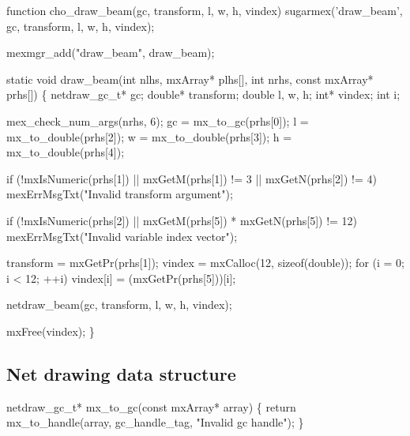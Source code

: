 \nwenddocs{}\endmoddef
function cho_draw_beam(gc, transform, l, w, h, vindex)
sugarmex('draw_beam', gc, transform, l, w, h, vindex);
\nwendcode{}\nwdocspar

\nwenddocs{}\plusendmoddef
mexmgr_add("draw_beam", draw_beam);
\nwendcode{}\nwdocspar

\nwenddocs{}\plusendmoddef
static void draw_beam(int nlhs, mxArray* plhs[],
                      int nrhs, const mxArray* prhs[])
\{
    netdraw_gc_t* gc;
    double* transform;
    double l, w, h;
    int* vindex;
    int i;

    mex_check_num_args(nrhs, 6);
    gc = mx_to_gc(prhs[0]);
    l  = mx_to_double(prhs[2]);
    w  = mx_to_double(prhs[3]);
    h  = mx_to_double(prhs[4]);

    if (!mxIsNumeric(prhs[1]) || mxGetM(prhs[1]) != 3 || mxGetN(prhs[2]) != 4)
        mexErrMsgTxt("Invalid transform argument");

    if (!mxIsNumeric(prhs[2]) || mxGetM(prhs[5]) * mxGetN(prhs[5]) != 12)
        mexErrMsgTxt("Invalid variable index vector");

    transform = mxGetPr(prhs[1]);
    vindex = mxCalloc(12, sizeof(double));
    for (i = 0; i < 12; ++i)
        vindex[i] = (mxGetPr(prhs[5]))[i];

    netdraw_beam(gc, transform, l, w, h, vindex);

    mxFree(vindex);
\}

\nwendcode{}\nwdocspar


\subsection{Net drawing data structure}

\nwenddocs{}\endmoddef
netdraw_gc_t* mx_to_gc(const mxArray* array)
\{
    return mx_to_handle(array, gc_handle_tag, "Invalid gc handle");
\}

